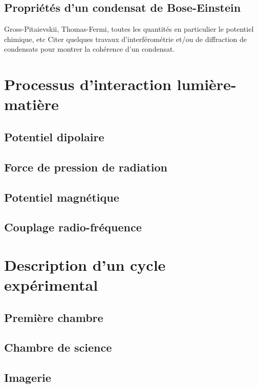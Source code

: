 \subsection{Propriétés d'un condensat de Bose-Einstein}
Gross-Pitaievskii, Thomas-Fermi, toutes les quantités en particulier le potentiel chimique, etc
Citer quelques travaux d'interférométrie et/ou de diffraction de condensats pour montrer la cohérence d'un condensat.

\section{Processus d'interaction lumière-matière} 
\subsection{Potentiel dipolaire}
\subsection{Force de pression de radiation}
\subsection{Potentiel magnétique}
\subsection{Couplage radio-fréquence} 

\section{Description d'un cycle expérimental}
\subsection{Première chambre}
\subsection{Chambre de science}
\subsection{Imagerie}




